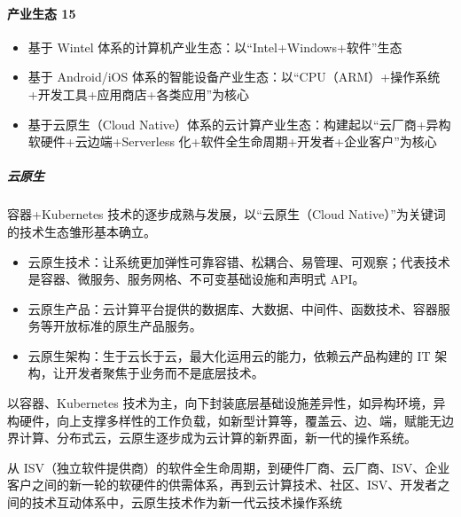 \documentclass[letterpaper,11pt,english]{sphinxmanual}
\begin{document}
\paragraph{产业生态 15\sphinxfootnotemark[375]}
\label{\detokenize{chapter_idea/understand_tech:id30}}%
\begin{footnotetext}[375]\sphinxAtStartFootnote
{}
%
\end{footnotetext}\ignorespaces \begin{itemize}
\item {} 
基于 Wintel 体系的计算机产业生态：以“Intel+Windows+软件”生态

\item {} 
基于 Android/iOS
体系的智能设备产业生态：以“CPU（ARM）+操作系统+开发工具+应用商店+各类应用”为核心

\item {} 
基于云原生（Cloud
Native）体系的云计算产业生态：构建起以“云厂商+异构软硬件+云边端+Serverless
化+软件全生命周期+开发者+企业客户”为核心

\end{itemize}


\subparagraph{云原生}
\label{\detokenize{chapter_idea/understand_tech:id31}}
容器+Kubernetes 技术的逐步成熟与发展，以“云原生（Cloud
Native）”为关键词的技术生态雏形基本确立。
\begin{itemize}
\item {} 
云原生技术：让系统更加弹性可靠容错、松耦合、易管理、可观察；代表技术是容器、微服务、服务网格、不可变基础设施和声明式
API。

\item {} 
云原生产品：云计算平台提供的数据库、大数据、中间件、函数技术、容器服务等开放标准的原生产品服务。

\item {} 
云原生架构：生于云长于云，最大化运用云的能力，依赖云产品构建的 IT
架构，让开发者聚焦于业务而不是底层技术。

\end{itemize}

以容器、Kubernetes
技术为主，向下封装底层基础设施差异性，如异构环境，异构硬件，向上支撑多样性的工作负载，如新型计算等，覆盖云、边、端，赋能无边界计算、分布式云，云原生逐步成为云计算的新界面，新一代的操作系统。

从
ISV（独立软件提供商）的软件全生命周期，到硬件厂商、云厂商、ISV、企业客户之间的新一轮的软硬件的供需体系，再到云计算技术、社区、ISV、开发者之间的技术互动体系中，云原生技术作为新一代云技术操作系统
\end{document}
